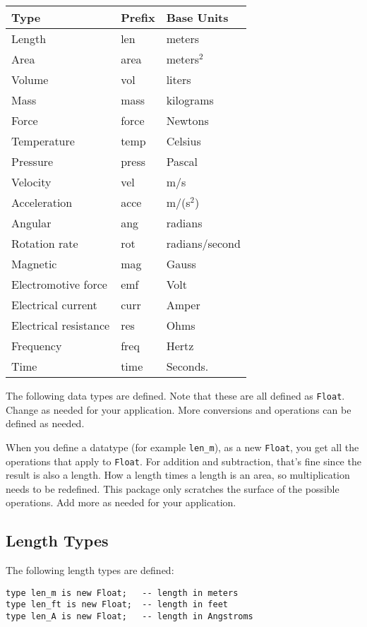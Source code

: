 \documentclass[10pt, openany]{book}
\newcommand{\datatype}[1]{\texttt{#1}}
\begin{document}
\begin{center}
\begin{tabular}{|l|l|l|}
\hline
Type & Prefix & Base Units\\
\hline
Length &  len & meters\\
Area & area & meters$^2$\\
Volume & vol & liters\\
Mass &  mass & kilograms\\
Force & force & Newtons\\
Temperature & temp & Celsius\\
Pressure & press & Pascal\\
Velocity & vel & m/s\\
Acceleration & acce & m/(s$^2$)\\
Angular & ang & radians\\
Rotation rate & rot & radians/second\\
Magnetic & mag & Gauss\\
Electromotive force & emf & Volt\\
Electrical current & curr & Amper\\
Electrical resistance & res & Ohms\\
Frequency & freq & Hertz\\
Time & time & Seconds.\\
\hline
\end{tabular}
\end{center}

The following data types are defined.  Note that these are all defined as \datatype{Float}.  Change as needed for your application.  More conversions and operations can be defined as needed.

When you define a datatype (for example \datatype{len\_m}), as a new \datatype{Float}, you get all the operations that apply to \datatype{Float}.  For addition and subtraction, that's fine since the result is also a length.  How a length times a length is an area, so multiplication needs to be redefined.  This package only scratches the surface of the possible operations.  Add more as needed for your application.

\subsection{Length Types}
The following length types are defined:
\begin{lstlisting}
type len_m is new Float;   -- length in meters
type len_ft is new Float;  -- length in feet
type len_A is new Float;   -- length in Angstroms
\end{lstlisting}
\end{document}
